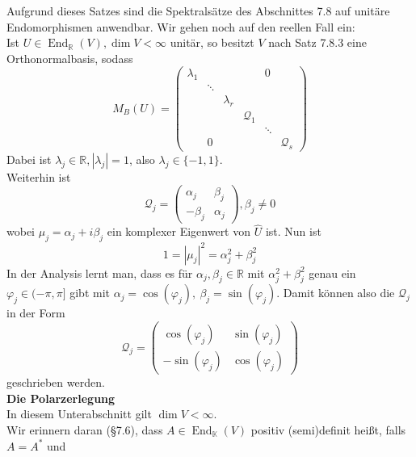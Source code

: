 \documentclass[12pt,a4paper]{article}
\theoremstyle{definition}
\theoremstyle{remark}
\renewcommand{\hat}[1]{\widehat{#1}}
\DeclareMathOperator{\End}{End}
\begin{document}
	Aufgrund dieses Satzes sind die Spektralsätze des Abschnittes 7.8 auf unitäre Endomorphismen anwendbar. Wir gehen noch auf den reellen Fall ein: \\	
	Ist $U \in \End_{\mathbb{R}}(V), \dim V < \infty$ unitär, so besitzt $V$ nach Satz 7.8.3 eine Orthonormalbasis, sodass
	\begin{equation}
		M_B(U) = \begin{pmatrix}
			\lambda_1 & & & &0 & \\
			& \ddots& &  & & \\
			 & &\lambda_r & & & \\
			& & & \mathcal{Q}_1 & &  \\
			& & & & \ddots&  \\
			& 0& & & & \mathcal{Q}_s
		\end{pmatrix}
	\end{equation}
	Dabei ist $\lambda_j \in \mathbb{R}, |\lambda_j|=1$, also $\lambda_j \in \{ -1,1 \}$. \\
	Weiterhin ist
	\begin{equation}
		\mathcal{Q}_j = \begin{pmatrix}
			\alpha_j & \beta_j \\
			-\beta_j & \alpha_j
		\end{pmatrix}, \beta_j \neq 0
	\end{equation}		
	wobei $\mu_j = \alpha_j +i \beta_j$ ein komplexer Eigenwert von $\hat{U}$ ist. Nun ist
	\begin{equation}
		1 = |\mu_j|^2 = \alpha_j^2+\beta_j^2
	\end{equation}
	In der Analysis lernt man, dass es für $\alpha_j, \beta_j \in \mathbb{R}$ mit $\alpha_j^2+ \beta_j^2$ genau ein $\varphi_j \in (-\pi,\pi]$ gibt mit $\alpha_j = \cos (\varphi_j), \ \beta_j = \sin( \varphi_j)$. Damit können also die $\mathcal{Q}_j$ in der Form
	\begin{equation}
		\mathcal{Q}_j = \begin{pmatrix}
			\cos( \varphi_j) & \sin( \varphi_j) \\
			-\sin (\varphi_j )& \cos (\varphi_j)
		\end{pmatrix}
	\end{equation}
	geschrieben werden. \\
	\textbf{Die Polarzerlegung} \\
	In diesem Unterabschnitt gilt $\dim V < \infty$. \\
	Wir erinnern daran (§7.6), dass $A \in \End_{\mathbb{K}}(V)$ positiv (semi)definit heißt, falls $A = A^*$ und \\ 
\end{document}
